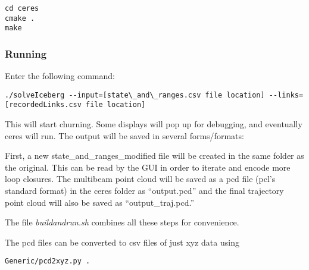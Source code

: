 \documentclass[12pt]{amsart}
\begin{document}
\begin{lstlisting}
cd ceres
cmake .
make
\end{lstlisting} 



\subsubsection{Running} Enter the following command:
\begin{tiny}
\begin{lstlisting}
./solveIceberg --input=[state\_and\_ranges.csv file location] --links=[recordedLinks.csv file location]
\end{lstlisting} 
\end{tiny}
This will start churning. Some displays will pop up for debugging, and eventually ceres will run. The output will be saved in several forms/formats:

First, a new state\_and\_ranges\_modified file will be created in the same folder as the original. This can be read by the GUI in order to iterate and encode more loop closures. The multibeam point cloud will be saved as a pcd file (pcl's standard format) in the ceres folder as ``output.pcd'' and the final trajectory point cloud will also be saved as ``output\_traj.pcd.''


The file \emph{buildandrun.sh} combines all these steps for convenience.

The pcd files can be converted to csv files of just xyz data using 
\begin{lstlisting}
Generic/pcd2xyz.py .
\end{lstlisting}
\end{document}
